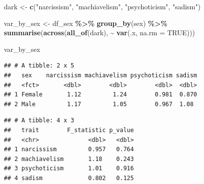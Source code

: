 \documentclass[
]{article}
\newenvironment{Shaded}{\begin{snugshade}}{\end{snugshade}}
\newcommand{\AttributeTok}[1]{\textcolor[rgb]{0.13,0.29,0.53}{#1}}
\newcommand{\ConstantTok}[1]{\textcolor[rgb]{0.56,0.35,0.01}{#1}}
\newcommand{\ControlFlowTok}[1]{\textcolor[rgb]{0.13,0.29,0.53}{\textbf{#1}}}
\newcommand{\DecValTok}[1]{\textcolor[rgb]{0.00,0.00,0.81}{#1}}
\newcommand{\FunctionTok}[1]{\textcolor[rgb]{0.13,0.29,0.53}{\textbf{#1}}}
\newcommand{\NormalTok}[1]{#1}
\newcommand{\OtherTok}[1]{\textcolor[rgb]{0.56,0.35,0.01}{#1}}
\newcommand{\SpecialCharTok}[1]{\textcolor[rgb]{0.81,0.36,0.00}{\textbf{#1}}}
\newcommand{\StringTok}[1]{\textcolor[rgb]{0.31,0.60,0.02}{#1}}
\begin{document}
\begin{Shaded}
\begin{Highlighting}[]
\NormalTok{dark }\OtherTok{\textless{}{-}} \FunctionTok{c}\NormalTok{(}\StringTok{"narcissism"}\NormalTok{, }\StringTok{"machiavelism"}\NormalTok{, }\StringTok{"psychoticism"}\NormalTok{, }\StringTok{"sadism"}\NormalTok{)}

\NormalTok{var\_by\_sex }\OtherTok{\textless{}{-}}\NormalTok{ df\_sex }\SpecialCharTok{\%\textgreater{}\%}
  \FunctionTok{group\_by}\NormalTok{(sex) }\SpecialCharTok{\%\textgreater{}\%}
  \FunctionTok{summarise}\NormalTok{(}\FunctionTok{across}\NormalTok{(}\FunctionTok{all\_of}\NormalTok{(dark), }\SpecialCharTok{\textasciitilde{}} \FunctionTok{var}\NormalTok{(.x, }\AttributeTok{na.rm =} \ConstantTok{TRUE}\NormalTok{))) }

\NormalTok{var\_by\_sex}
\end{Highlighting}
\end{Shaded}

\begin{verbatim}
## # A tibble: 2 x 5
##   sex    narcissism machiavelism psychoticism sadism
##   <fct>       <dbl>        <dbl>        <dbl>  <dbl>
## 1 Female       1.12         1.24        0.981  0.870
## 2 Male         1.17         1.05        0.967  1.08
\end{verbatim}

\begin{Shaded}
\end{Shaded}

\begin{verbatim}
## # A tibble: 4 x 3
##   trait        F_statistic p_value
##   <chr>              <dbl>   <dbl>
## 1 narcissism         0.957   0.764
## 2 machiavelism       1.18    0.243
## 3 psychoticism       1.01    0.916
## 4 sadism             0.802   0.125
\end{verbatim}
\end{document}
